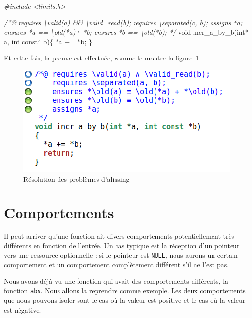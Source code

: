 \documentclass[12pt,francais,]{scrbook}
\newenvironment{Shaded}{}{}
\newcommand{\DataTypeTok}[1]{\textcolor[rgb]{0.56,0.13,0.00}{{#1}}}
\newcommand{\CommentTok}[1]{\textcolor[rgb]{0.38,0.63,0.69}{\textit{{#1}}}}
\newcommand{\NormalTok}[1]{{#1}}
\begin{document}
\begin{footnotesize}\begin{Shaded}
\begin{Highlighting}[]
\CommentTok{#include <limits.h>}

\CommentTok{/*@}
\CommentTok{  requires \textbackslash{}valid(a) && \textbackslash{}valid_read(b);}
\CommentTok{  requires \textbackslash{}separated(a, b);}
\CommentTok{  assigns  *a;}
\CommentTok{  ensures  *a == \textbackslash{}old(*a)+ *b;}
\CommentTok{  ensures  *b == \textbackslash{}old(*b);}
\CommentTok{*/}
\DataTypeTok{void} \NormalTok{incr_a_by_b(}\DataTypeTok{int}\NormalTok{* a, }\DataTypeTok{int} \DataTypeTok{const}\NormalTok{* b)\{}
  \NormalTok{*a += *b;}
\NormalTok{\}}
\end{Highlighting}
\end{Shaded}\end{footnotesize}

Et cette fois, la preuve est effectuée, comme le montre la
figure~\ref{fig:2-2-2-incr_a_by_b-2}.

\begin{figure}[htbp]
\centering
\includegraphics[scale=0.5]{2-2-2-incr_a_by_b-2.png}
\caption{Résolution des problèmes d'aliasing}
\label{fig:2-2-2-incr_a_by_b-2}
\end{figure}

\section{Comportements}\label{comportements}

Il peut arriver qu'une fonction ait divers comportements potentiellement
très différents en fonction de l'entrée. Un cas typique est la réception
d'un pointeur vers une ressource optionnelle : si le pointeur est
\texttt{NULL}, nous aurons un certain comportement et un comportement
complètement différent s'il ne l'est pas.

Nous avons déjà vu une fonction qui avait des comportements différents,
la fonction \texttt{abs}. Nous allons la reprendre comme exemple. Les
deux comportements que nous pouvons isoler sont le cas où la valeur est
positive et le cas où la valeur est négative.
\end{document}
